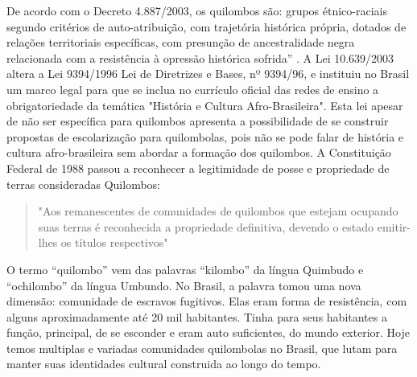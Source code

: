 \hspace{1.5cm}
De acordo com o Decreto 4.887/2003, os quilombos são: grupos étnico-raciais segundo critérios de auto-atribuição, com trajetória histórica própria, dotados de relações territoriais específicas, com presunção de ancestralidade negra relacionada com a resistência à opressão histórica sofrida” \cite{brasil2}. A Lei 10.639/2003 altera a Lei 9394/1996 Lei de Diretrizes e Bases, nº 9394/96, e instituiu no Brasil um marco legal para que se inclua no currículo oficial das redes de ensino a obrigatoriedade da temática "História e Cultura Afro-Brasileira". Esta lei apesar de não ser específica para quilombos apresenta a possibilidade de se construir propostas de escolarização para quilombolas, pois não se pode falar de história e cultura afro-brasileira sem abordar a formação dos quilombos. A Constituição Federal de 1988 passou a reconhecer a legitimidade de posse e propriedade de terras consideradas Quilombos:\\
\begin{quote}
"Aos remanescentes de comunidades de quilombos que estejam ocupando suas terras é reconhecida a propriedade definitiva, devendo o estado emitir-lhes os títulos respectivos" \cite{brasil1}
\end{quote}
\hspace{1.5cm}
O termo “quilombo” vem das palavras “kilombo” da língua Quimbudo e “ochilombo” da língua Umbundo. No Brasil, a palavra tomou uma nova dimensão: comunidade de escravos fugitivos. Elas eram forma de resistência, com alguns aproximadamente até 20 mil habitantes. Tinha para seus habitantes a função, principal, de se esconder e eram auto suficientes, do mundo exterior. Hoje temos multiplas e variadas comunidades quilombolas no Brasil, que lutam para manter suas identidades cultural construida ao longo do tempo.\\

